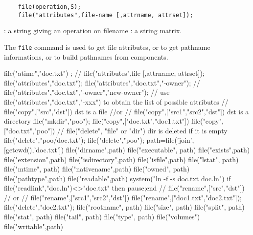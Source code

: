 \begin{mandesc}
\end{mandesc}

\begin{calling_sequence}
  \begin{verbatim}
    file(operation,S);
    file("attributes",file-name [,attrname, attrset]); 
  \end{verbatim}
\end{calling_sequence}
\begin{parameters}
  \begin{varlist}
    : a string giving an operation on filename
    : a string matrix.
  \end{varlist}
\end{parameters}
\begin{mandescription}
  The \verb!file! command is used to get file attributes, or 
  to get pathname informations, or to build pathnames from 
  components.
\end{mandescription}
\begin{examples}
  \begin{nspcode}
    file("atime","doc.txt") ;
    // file("attributes",file [,attrname, attrset]);
    file("attributes","doc.txt");
    file("attributes","doc.txt","-owner");
    // file("attributes","doc.txt","-owner","new-owner");
    // use file("attributes","doc.txt","-xxx") to obtain the list of possible attributes
    // file("copy",["src","dst"])	    dst is a file 
    //or 
    // file("copy",["src1","src2","dst"])  dst is a directory 
    file("mkdir","poo");
    file("copy",["doc.txt","doc1.txt"]) 
    file("copy",["doc.txt","poo"]) 
    // file("delete", "file" or "dir")     dir is deleted if it is empty 
    file("delete","poo/doc.txt");
    file("delete","poo");
    path=file('join',[getcwd(),'doc.txt'])
    file("dirname",path)
    file("executable", path)
    file("exists",path)
    file("extension",path)
    file("isdirectory",path)
    file("isfile",path) 
    file("lstat", path) 
    file("mtime", path) 
    file("nativename",path)
    file("owned", path)
    file("pathtype",path) 
    file("readable",path) 
    system("ln -f -s doc.txt doc.ln")
    if file("readlink","doc.ln")<>"doc.txt" then pause;end
    // file("rename",["src","dst"])
    // or 
    // file("rename",["src1","src2","dst"])
    file("rename",["doc1.txt","doc2.txt"]);
    file("delete","doc2.txt");
    file("rootname", path)
    file("size", path)
    file("split", path)
    file("stat", path)
    file("tail", path)
    file("type", path)
    file("volumes")
    file("writable",path)
  \end{nspcode}
\end{examples}
\begin{manseealso}
\end{manseealso}

